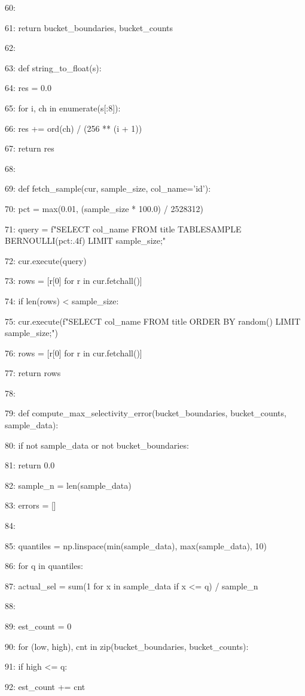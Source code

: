 \documentclass[11pt,a4paper]{article}
\begin{document}
{60:

61:     return bucket\_boundaries, bucket\_counts

62:

63: def string\_to\_float(s):

64:     res = 0.0

65:     for i, ch in enumerate(s[:8]):

66:         res += ord(ch) / (256 ** (i + 1))

67:     return res

68:

69: def fetch\_sample(cur, sample\_size, col\_name='id'):

70:     pct = max(0.01, (sample\_size * 100.0) / 2528312)

71:     query = f"SELECT {col\_name} FROM title TABLESAMPLE BERNOULLI({pct:.4f}) LIMIT {sample\_size};"

72:     cur.execute(query)

73:     rows = [r[0] for r in cur.fetchall()]

74:     if len(rows) < sample\_size:

75:         cur.execute(f"SELECT {col\_name} FROM title ORDER BY random() LIMIT {sample\_size};")

76:         rows = [r[0] for r in cur.fetchall()]

77:     return rows

78:

79: def compute\_max\_selectivity\_error(bucket\_boundaries, bucket\_counts, sample\_data):

80:     if not sample\_data or not bucket\_boundaries:

81:         return 0.0

82:     sample\_n = len(sample\_data)

83:     errors = []

84:

85:     quantiles = np.linspace(min(sample\_data), max(sample\_data), 10)

86:     for q in quantiles:

87:         actual\_sel = sum(1 for x in sample\_data if x <= q) / sample\_n

88:

89:         est\_count = 0

90:         for (low, high), cnt in zip(bucket\_boundaries, bucket\_counts):

91:             if high <= q:

92:                 est\_count += cnt

}
\end{document}
